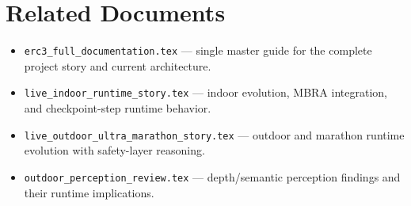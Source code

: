 \documentclass[11pt]{article}
\begin{document}
\section{Related Documents}
\begin{itemize}
  \item \texttt{erc3\_full\_documentation.tex} --- single master guide for the complete project story and current architecture.
  \item \texttt{live\_indoor\_runtime\_story.tex} --- indoor evolution, MBRA integration, and checkpoint-step runtime behavior.
  \item \texttt{live\_outdoor\_ultra\_marathon\_story.tex} --- outdoor and marathon runtime evolution with safety-layer reasoning.
  \item \texttt{outdoor\_perception\_review.tex} --- depth/semantic perception findings and their runtime implications.
\end{itemize}
\end{document}
